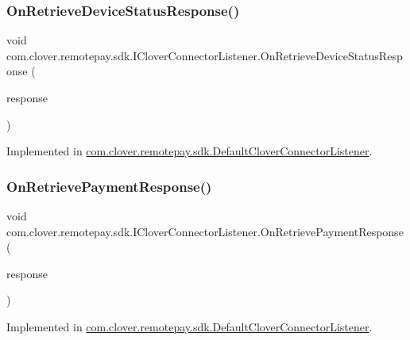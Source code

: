 \subsubsection{\texorpdfstring{On\+Retrieve\+Device\+Status\+Response()}{OnRetrieveDeviceStatusResponse()}}
{\footnotesize\ttfamily void com.\+clover.\+remotepay.\+sdk.\+I\+Clover\+Connector\+Listener.\+On\+Retrieve\+Device\+Status\+Response (\begin{DoxyParamCaption}\item[{\hyperlink{classcom_1_1clover_1_1remotepay_1_1sdk_1_1_retrieve_device_status_response}{Retrieve\+Device\+Status\+Response}}]{response }\end{DoxyParamCaption})}



Implemented in \hyperlink{classcom_1_1clover_1_1remotepay_1_1sdk_1_1_default_clover_connector_listener_a493d5c1fde5a535262b497450c4d2a8f}{com.\+clover.\+remotepay.\+sdk.\+Default\+Clover\+Connector\+Listener}.

\mbox{\label{interfacecom_1_1clover_1_1remotepay_1_1sdk_1_1_i_clover_connector_listener_a80b66ca256c60f88d9c3bc1bf7df1a25}} 
\subsubsection{\texorpdfstring{On\+Retrieve\+Payment\+Response()}{OnRetrievePaymentResponse()}}
{\footnotesize\ttfamily void com.\+clover.\+remotepay.\+sdk.\+I\+Clover\+Connector\+Listener.\+On\+Retrieve\+Payment\+Response (\begin{DoxyParamCaption}\item[{\hyperlink{classcom_1_1clover_1_1remotepay_1_1sdk_1_1_retrieve_payment_response}{Retrieve\+Payment\+Response}}]{response }\end{DoxyParamCaption})}



Implemented in \hyperlink{classcom_1_1clover_1_1remotepay_1_1sdk_1_1_default_clover_connector_listener_a275810025eccbd5cc81fe48752fa8872}{com.\+clover.\+remotepay.\+sdk.\+Default\+Clover\+Connector\+Listener}.

